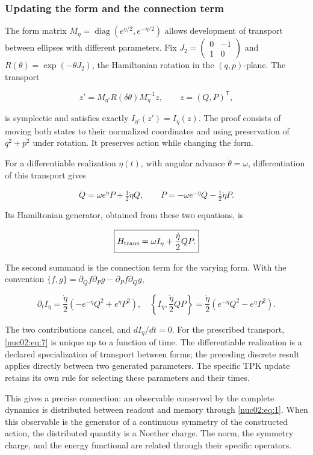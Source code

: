 \subsubsection{Updating the form and the connection term}

The form matrix \(M_\eta=\operatorname{diag}(e^{\eta/2},e^{-\eta/2})\) allows development of transport between ellipses with different parameters. Fix \(J_2=\begin{pmatrix}0&-1\\1&0\end{pmatrix}\) and \(R(\theta)=\exp(-\theta J_2)\), the Hamiltonian rotation in the \((q,p)\)-plane. The transport

\[
z'=M_{\eta'}R(\delta\theta)M_\eta^{-1}z,
\qquad z=(Q,P)^\mathsf T,
\]

is symplectic and satisfies exactly \(I_{\eta'}(z')=I_\eta(z)\). The proof consists of moving both states to their normalized coordinates and using preservation of \(q^2+p^2\) under rotation. It preserves action while changing the form.

For a differentiable realization \(\eta(t)\), with angular advance \(\dot\theta=\omega\), differentiation of this transport gives

\[
\dot Q=\omega e^\eta P+\tfrac12\dot\eta Q,\qquad
\dot P=-\omega e^{-\eta}Q-\tfrac12\dot\eta P.
\]

Its Hamiltonian generator, obtained from these two equations, is

\begin{equation}
\boxed{H_{\rm trans}=\omega I_\eta+\frac{\dot\eta}{2}QP.}\label{nuc02:eq:7}
\end{equation}

The second summand is the connection term for the varying form. With the convention \(\{f,g\}=\partial_Qf\partial_Pg-\partial_Pf\partial_Qg\),

\[
\partial_tI_\eta=\frac{\dot\eta}{2}(-e^{-\eta}Q^2+e^\eta P^2),
\quad
\left\{I_\eta,\frac{\dot\eta}{2}QP\right\}
=\frac{\dot\eta}{2}(e^{-\eta}Q^2-e^\eta P^2).
\]

The two contributions cancel, and \(dI_\eta/dt=0\). For the prescribed transport, \eqref{nuc02:eq:7} is unique up to a function of time. The differentiable realization is a declared specialization of transport between forms; the preceding discrete result applies directly between two generated parameters. The specific TPK update retains its own rule for selecting these parameters and their times.

This gives a precise connection: an observable conserved by the complete dynamics is distributed between readout and memory through \eqref{nuc02:eq:1}. When this observable is the generator of a continuous symmetry of the constructed action, the distributed quantity is a Noether charge. The norm, the symmetry charge, and the energy functional are related through their specific operators.

